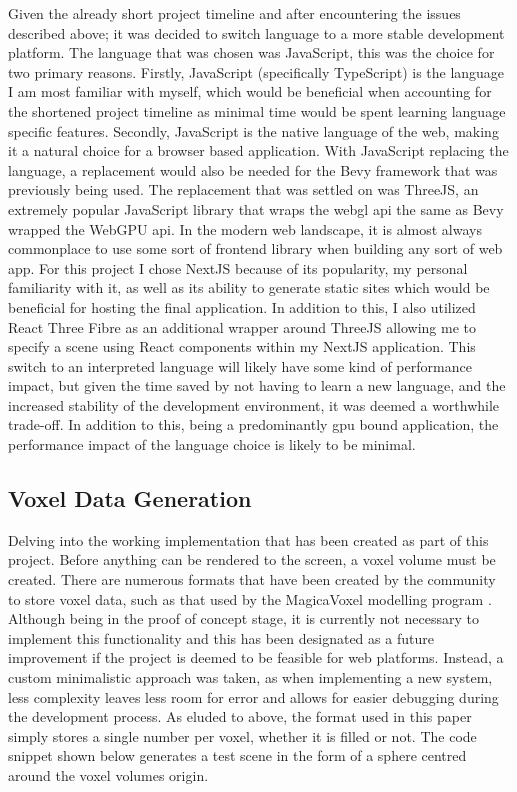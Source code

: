 \documentclass[titlepage]{article}
\begin{document}
Given the already short project timeline and after encountering the issues described above; it was decided to switch language to a more stable development platform. The language that was chosen was JavaScript, this was the choice for two primary reasons. Firstly, JavaScript (specifically TypeScript) is the language I am most familiar with myself, which would be beneficial when accounting for the shortened project timeline as minimal time would be spent learning language specific features. Secondly, JavaScript is the native language of the web, making it a natural choice for a browser based application. With JavaScript replacing the language, a replacement would also be needed for the Bevy framework that was previously being used. The replacement that was settled on was ThreeJS, an extremely popular JavaScript library that wraps the \gls{webgl} \gls{api} the same as Bevy wrapped the WebGPU \gls{api}. In the modern web landscape, it is almost always commonplace to use some sort of frontend library when building any sort of web app. For this project I chose NextJS because of its popularity, my personal familiarity with it, as well as its ability to generate static sites which would be beneficial for hosting the final application. In addition to this, I also utilized React Three Fibre as an additional wrapper around ThreeJS allowing me to specify a scene using React components within my NextJS application. This switch to an interpreted language will likely have some kind of performance impact, but given the time saved by not having to learn a new language, and the increased stability of the development environment, it was deemed a worthwhile trade-off. In addition to this, being a predominantly \gls{gpu} bound application, the performance impact of the language choice is likely to be minimal.

\subsection{Voxel Data Generation}

Delving into the working implementation that has been created as part of this project. Before anything can be rendered to the screen, a voxel volume must be created. There are numerous formats that have been created by the community to store voxel data, such as that used by the MagicaVoxel modelling program \cite{magicavoxel}. Although being in the proof of concept stage, it is currently not necessary to implement this functionality and this has been designated as a future improvement if the project is deemed to be feasible for web platforms. Instead, a custom minimalistic approach was taken, as when implementing a new system, less complexity leaves less room for error and allows for easier debugging during the development process. As eluded to above, the format used in this paper simply stores a single number per voxel, whether it is filled or not. The code snippet shown below generates a test scene in the form of a sphere centred around the voxel volumes origin.
\end{document}
